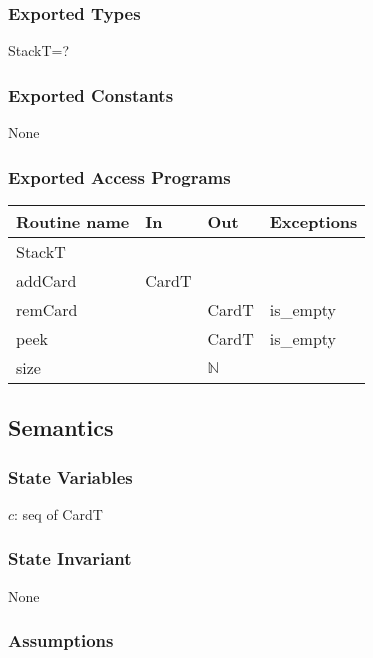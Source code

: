 \documentclass[12pt]{article}
\begin{document}
\subsubsection*{Exported Types}

StackT=?

\subsubsection*{Exported Constants}

None

\subsubsection*{Exported Access Programs}

\begin{tabular}{| l | l | l | l |}
    \hline
    \textbf{Routine name} & \textbf{In} & \textbf{Out} & \textbf{Exceptions}\\
    \hline
    StackT & ~ & ~ & ~\\
    \hline
    addCard & CardT & ~ & ~\\
    \hline
    remCard & ~ & CardT & is\_empty\\
    \hline
    peek & ~ & CardT & is\_empty\\
    \hline
    size & ~ & $\mathbb{N}$ & ~\\
    \hline
\end{tabular}

\subsection* {Semantics}

\subsubsection* {State Variables}

$c$: seq of CardT\\

\subsubsection* {State Invariant}

None

\subsubsection* {Assumptions}
\end{document}
